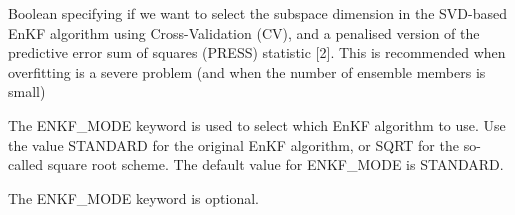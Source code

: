 \documentclass[a4paper,10pt,english]{sphinxmanual}
\begin{document}
\begin{sphinxShadowBox}

Boolean specifying if we want to select the subspace dimension in the
SVD-based EnKF algorithm using Cross-Validation (CV), and a penalised version
of the predictive error sum of squares (PRESS) statistic {[}2{]}. This is
recommended when overfitting is a severe problem (and when the number of
ensemble members is small)


%
\begin{sphinxVerbatim}[commandchars=\\\{\}]
      
 

    
 
\end{sphinxVerbatim}
\end{sphinxShadowBox}
\label{\detokenize{keywords/index:enkf-mode}}
\begin{sphinxShadowBox}

The ENKF\_MODE keyword is used to select which EnKF algorithm to use. Use the
value STANDARD for the original EnKF algorithm, or SQRT for the so-called
square root scheme. The default value for ENKF\_MODE is STANDARD.


%
\begin{sphinxVerbatim}[commandchars=\\\{\}]
     
 
\end{sphinxVerbatim}


%
\begin{sphinxVerbatim}[commandchars=\\\{\}]
    
 
\end{sphinxVerbatim}

The ENKF\_MODE keyword is optional.
\end{sphinxShadowBox}
\end{document}
